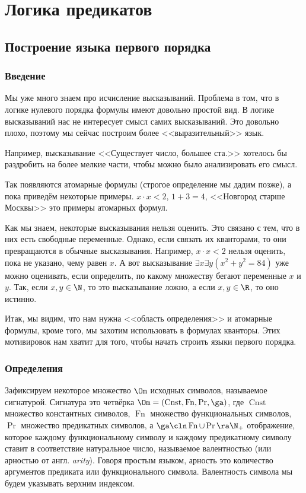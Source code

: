 \documentclass[a4paper,draft]{article}
\DeclareMathOperator{\Cnst}{Cnst}
\DeclareMathOperator{\Fn}{Fn}
\begin{document}
\section{Логика предикатов}

\subsection{Построение языка первого порядка}

\subsubsection{Введение}

Мы уже много знаем про исчисление высказываний.
Проблема в том, что в логике нулевого порядка формулы имеют довольно
простой вид. В логике высказываний нас не интересует смысл самих
высказываний. Это довольно плохо, поэтому мы сейчас построим более
<<выразительный>> язык.

Например, высказывание <<Существует число, большее ста.>> хотелось
бы раздробить на более мелкие части, чтобы можно было анализировать
его смысл.

Так появляются атомарные формулы (строгое определение мы дадим
позже), а пока приведём некоторые примеры. $x\cdot x < 2$, $1 + 3=4$,
<<Новгород старше Москвы>> это примеры атомарных формул.

Как мы знаем, некоторые высказывания нельзя оценить. Это связано с тем,
что в них есть свободные переменные. Однако, если связать их кванторами,
то они превращаются в обычные высказывания.
Например, $x \cdot x < 2$ нельзя оценить, пока не указано, чему равен $x$.
А вот высказывание $\exi x \exi y (x^2 + y^2 = 84)$ уже можно оценивать,
если определить, по какому множеству бегают переменные $x$ и $y$.
Так, если $x, y \in \N$, то это высказывание ложно,
а если $x, y\in \R$, то оно истинно.

Итак, мы видим, что нам нужна <<область определения>> и атомарные формулы,
кроме того, мы захотим использовать в формулах кванторы.
Этих мотивировок нам хватит для того, чтобы начать строить языки первого
порядка.

\subsubsection{Определения}

Зафиксируем некоторое множество $\Om$ исходных символов,
называемое сигнатурой. Сигнатура это четвёрка $\Om = (\Cnst, \Fn, \Pr, \ga)$,
где $\Cnst$ множество константных символов, $\Fn$ множество функциональных
символов, $\Pr$ множество предикатных символов, а $\ga\cln \Fn \cup \Pr \ra \N_+$ отображение,
которое каждому функциональному символу и каждому предикатному символу ставит
в соответствие натуральное число, называемое валентностью (или арностью от англ. \emph{arity}).
Говоря простым языком, арность это количество аргументов предиката или
функционального символа. Валентность символа мы будем указывать верхним индексом.
\end{document}
